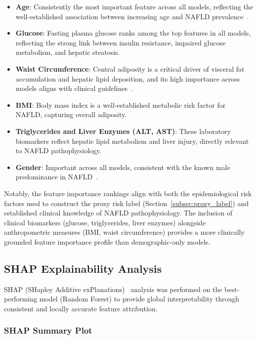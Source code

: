 \documentclass[conference,10pt]{IEEEtran}
\begin{document}
\begin{itemize}
    \item \textbf{Age}: Consistently the most important feature across all models, reflecting the well-established association between increasing age and NAFLD prevalence~\cite{younossi2016global}.
    \item \textbf{Glucose}: Fasting plasma glucose ranks among the top features in all models, reflecting the strong link between insulin resistance, impaired glucose metabolism, and hepatic steatosis.
    \item \textbf{Waist Circumference}: Central adiposity is a critical driver of visceral fat accumulation and hepatic lipid deposition, and its high importance across models aligns with clinical guidelines~\cite{chalasani2018diagnosis}.
    \item \textbf{BMI}: Body mass index is a well-established metabolic risk factor for NAFLD, capturing overall adiposity.
    \item \textbf{Triglycerides and Liver Enzymes (ALT, AST)}: These laboratory biomarkers reflect hepatic lipid metabolism and liver injury, directly relevant to NAFLD pathophysiology.
    \item \textbf{Gender}: Important across all models, consistent with the known male predominance in NAFLD~\cite{chalasani2018diagnosis}.
\end{itemize}

Notably, the feature importance rankings align with both the epidemiological risk factors used to construct the proxy risk label (Section~\ref{subsec:proxy_label}) and established clinical knowledge of NAFLD pathophysiology. The inclusion of clinical biomarkers (glucose, triglycerides, liver enzymes) alongside anthropometric measures (BMI, waist circumference) provides a more clinically grounded feature importance profile than demographic-only models.

\subsection{SHAP Explainability Analysis}
\label{subsec:shap}

SHAP (SHapley Additive exPlanations)~\cite{lundberg2017unified} analysis was performed on the best-performing model (Random Forest) to provide global interpretability through consistent and locally accurate feature attribution.

\subsubsection{SHAP Summary Plot}
\end{document}
